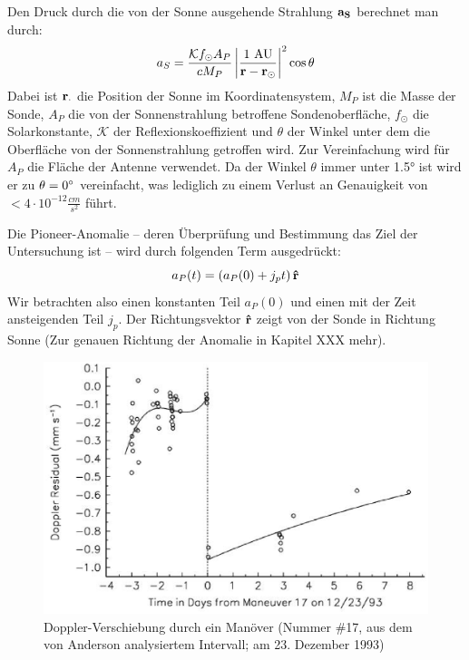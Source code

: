 Den Druck durch die von der Sonne ausgehende Strahlung $\bf a_S$ berechnet man durch:
\begin{equation}
a_S = \frac{\mathcal{K}f_\odot A_P}{c M_P} \left| \frac{1\ \mathrm{AU}}{{\bf r}-{\bf r_\odot}} \right|^2 \cos\theta
\end{equation}
Dabei ist $\bf r_\cdot$ die Position der Sonne im Koordinatensystem, $M_P$ ist die Masse der Sonde, $A_P$ die von der Sonnenstrahlung betroffene Sondenoberfläche, $f_\odot$ die Solarkonstante, $\mathcal{K}$ der Reflexionskoeffizient und $\theta$ der Winkel unter dem die Oberfläche von der Sonnenstrahlung getroffen wird.
Zur Vereinfachung wird für $A_P$ die Fläche der Antenne verwendet.
Da der Winkel $\theta$ immer unter 1.5° ist wird er zu $\theta = 0\degree$ vereinfacht, was lediglich zu einem Verlust an Genauigkeit von $< 4 \cdot 10^{-12} \frac{cm}{s^2}$ führt\cite{Markwardt2002}.

Die Pioneer-Anomalie – deren Überprüfung und Bestimmung das Ziel der Untersuchung ist – wird durch folgenden Term ausgedrückt:
\begin{equation}
a_P(t) = \left( a_P(0) + j_pt\right){\bf \hat{r}}
\end{equation}
Wir betrachten also einen konstanten Teil $a_P(0)$ und einen mit der Zeit ansteigenden Teil $j_p$. Der Richtungsvektor $\bf \hat{r}$ zeigt von der Sonde in Richtung Sonne (Zur genauen Richtung der Anomalie in Kapitel XXX mehr).

\begin{figure}[htbb]
\begin{minipage}[t]{.8\linewidth}
	\centering
	\includegraphics[width=\linewidth]{images/manoever}
  \caption{Doppler-Verschiebung durch ein Manöver (Nummer \#17, aus dem von Anderson\cite{Anderson2002} analysiertem Intervall; am 23. Dezember 1993)}\label{fig:manoever}
\end{minipage}
	\centering
 \end{figure}

